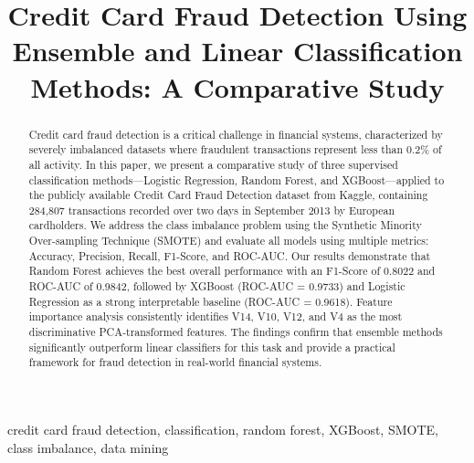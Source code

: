 \documentclass[conference]{IEEEtran}
\begin{document}
\title{Credit Card Fraud Detection Using Ensemble and Linear Classification Methods: A Comparative Study}

\author{
\and
{}
}

\maketitle

\begin{abstract}
Credit card fraud detection is a critical challenge in financial systems, characterized by severely imbalanced datasets where fraudulent transactions represent less than 0.2\% of all activity. In this paper, we present a comparative study of three supervised classification methods—Logistic Regression, Random Forest, and XGBoost—applied to the publicly available Credit Card Fraud Detection dataset from Kaggle, containing 284,807 transactions recorded over two days in September 2013 by European cardholders. We address the class imbalance problem using the Synthetic Minority Over-sampling Technique (SMOTE) and evaluate all models using multiple metrics: Accuracy, Precision, Recall, F1-Score, and ROC-AUC. Our results demonstrate that Random Forest achieves the best overall performance with an F1-Score of 0.8022 and ROC-AUC of 0.9842, followed by XGBoost (ROC-AUC = 0.9733) and Logistic Regression as a strong interpretable baseline (ROC-AUC = 0.9618). Feature importance analysis consistently identifies V14, V10, V12, and V4 as the most discriminative PCA-transformed features. The findings confirm that ensemble methods significantly outperform linear classifiers for this task and provide a practical framework for fraud detection in real-world financial systems.
\end{abstract}

\begin{IEEEkeywords}
credit card fraud detection, classification, random forest, XGBoost, SMOTE, class imbalance, data mining
\end{IEEEkeywords}
\end{document}
